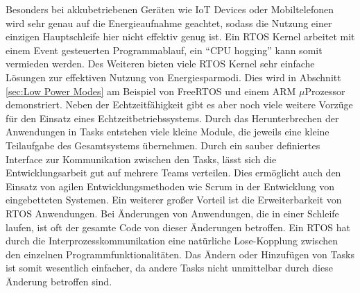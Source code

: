 Besonders bei akkubetriebenen Geräten wie IoT Devices oder Mobiltelefonen wird sehr genau auf die Energieaufnahme geachtet, sodass die Nutzung einer einzigen Hauptschleife hier nicht effektiv genug ist. Ein RTOS Kernel arbeitet mit einem Event gesteuerten Programmablauf, ein "`CPU hogging"' kann somit vermieden werden. Des Weiteren bieten viele RTOS Kernel sehr einfache Lösungen zur effektiven Nutzung von Energiesparmodi. Dies wird in Abschnitt \ref{sec:Low Power Modes} am Beispiel von FreeRTOS und einem ARM $\mu$Prozessor demonstriert. Neben der Echt\-zeit\-fähig\-keit gibt es aber noch viele weitere Vorzüge für den Einsatz eines Echtzeitbetriebssystems. Durch das Herunterbrechen der Anwendungen in Tasks entstehen viele kleine Module, die jeweils eine kleine Teilaufgabe des Gesamtsystems über\-neh\-men. Durch ein sauber definiertes Interface zur Kommunikation zwischen den Tasks, lässt sich die Entwicklungsarbeit gut auf mehrere Teams verteilen. Dies ermöglicht auch den Einsatz von agilen Entwicklungsmethoden wie Scrum in der Entwicklung von eingebetteten Systemen. Ein weiterer großer Vorteil ist die Erweiterbarkeit von RTOS Anwendungen. Bei Änderungen von Anwendungen, die in einer Schleife laufen, ist oft der gesamte Code von dieser Änderungen betroffen. Ein RTOS hat durch die Interprozesskommunikation eine natürliche Lose-Kopplung zwischen den einzelnen Programmfunktionalitäten. Das Än\-dern oder Hinzufügen von Tasks ist somit wesentlich einfacher, da andere Tasks nicht unmittelbar durch diese Än\-der\-ung betroffen sind. 




